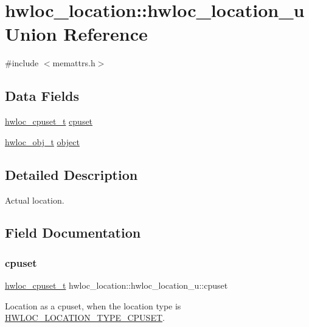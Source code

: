 \hypertarget{a00318}{}\section{hwloc\+\_\+location\+:\+:hwloc\+\_\+location\+\_\+u Union Reference}
\label{a00318}


{\ttfamily \#include $<$memattrs.\+h$>$}

\subsection*{Data Fields}
\begin{DoxyCompactItemize}
\item 
\hyperlink{a00183_ga4bbf39b68b6f568fb92739e7c0ea7801}{hwloc\+\_\+cpuset\+\_\+t} \hyperlink{a00318_a033bad8f6b891992f0c18b85a88c5561}{cpuset}
\item 
\hyperlink{a00185_ga79b8ab56877ef99ac59b833203391c7d}{hwloc\+\_\+obj\+\_\+t} \hyperlink{a00318_acf2ebf75869f0a53a884ac2ab3374122}{object}
\end{DoxyCompactItemize}


\subsection{Detailed Description}
Actual location. 

\subsection{Field Documentation}
\mbox{\label{a00318_a033bad8f6b891992f0c18b85a88c5561}} 
\subsubsection{\texorpdfstring{cpuset}{cpuset}}
{\footnotesize\ttfamily \hyperlink{a00183_ga4bbf39b68b6f568fb92739e7c0ea7801}{hwloc\+\_\+cpuset\+\_\+t} hwloc\+\_\+location\+::hwloc\+\_\+location\+\_\+u\+::cpuset}



Location as a cpuset, when the location type is \hyperlink{a00211_gga33099ba58f607fc70925da3777688586a7135318a86361ad75fd1648e6bf6d174}{H\+W\+L\+O\+C\+\_\+\+L\+O\+C\+A\+T\+I\+O\+N\+\_\+\+T\+Y\+P\+E\+\_\+\+C\+P\+U\+S\+ET}. 

